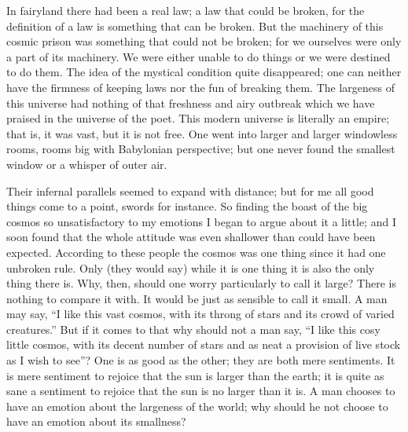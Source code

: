 In fairyland there had been a real law; a law that could be broken, for the definition of a law is something that can be broken. But the machinery of this cosmic prison was something that could not be broken; for we ourselves were only a part of its machinery. We were either unable to do things or we were destined to do them. The idea of the mystical condition quite disappeared; one can neither have the firmness of keeping laws nor the fun of breaking them. The largeness of this universe had nothing of that freshness and airy outbreak which we have praised in the universe of the poet. This modern universe is literally an empire; that is, it was vast, but it is not free. One went into larger and larger windowless rooms, rooms big with Babylonian perspective; but one never found the smallest window or a whisper of outer air.

Their infernal parallels seemed to expand with distance; but for me all good things come to a point, swords for instance. So finding the boast of the big cosmos so unsatisfactory to my emotions I began to argue about it a little; and I soon found that the whole attitude was even shallower than could have been expected. According to these people the cosmos was one thing since it had one unbroken rule. Only (they would say) while it is one thing it is also the only thing there is. Why, then, should one worry particularly to call it large? There is nothing to compare it with. It would be just as sensible to call it small. A man may say, “I like this vast cosmos, with its throng of stars and its crowd of varied creatures.” But if it comes to that why should not a man say, “I like this cosy little cosmos, with its decent number of stars and as neat a provision of live stock as I wish to see”? One is as good as the other; they are both mere sentiments. It is mere sentiment to rejoice that the sun is larger than the earth; it is quite as sane a sentiment to rejoice that the sun is no larger than it is. A man chooses to have an emotion about the largeness of the world; why should he not choose to have an emotion about its smallness?

